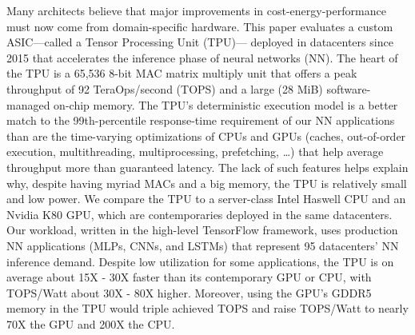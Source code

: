 Many architects believe that major improvements in cost-energy-performance must now come from domain-specific
hardware. This paper evaluates a custom ASIC—called a Tensor Processing Unit (TPU)— deployed in datacenters
since 2015 that accelerates the inference phase of neural networks (NN). The heart of the TPU is a 65,536 8-bit MAC
matrix multiply unit that offers a peak throughput of 92 TeraOps/second (TOPS) and a large (28 MiB)
software-managed on-chip memory. The TPU’s deterministic execution model is a better match to the 99th-percentile
response-time requirement of our NN applications than are the time-varying optimizations of CPUs and GPUs
(caches, out-of-order execution, multithreading, multiprocessing, prefetching, …) that help average throughput more
than guaranteed latency. The lack of such features helps explain why, despite having myriad MACs and a big
memory, the TPU is relatively small and low power. We compare the TPU to a server-class Intel Haswell CPU and an
Nvidia K80 GPU, which are contemporaries deployed in the same datacenters. Our workload, written in the high-level
TensorFlow framework, uses production NN applications (MLPs, CNNs, and LSTMs) that represent 95%
datacenters’ NN inference demand. Despite low utilization for some applications, the TPU is on average about 15X -
30X faster than its contemporary GPU or CPU, with TOPS/Watt about 30X - 80X higher. Moreover, using the GPU’s
GDDR5 memory in the TPU would triple achieved TOPS and raise TOPS/Watt to nearly 70X the GPU and 200X the
CPU.






